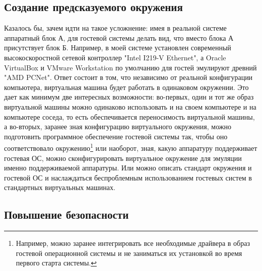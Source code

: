 \documentclass[14pt, a4paper]{article}
\begin{document}
\subsection*{Создание предсказуемого окружения}

Казалось бы, зачем идти на такое усложнение: имея в реальной системе аппаратный
блок А, для гостевой системы делать вид, что вместо блока А присутствует блок Б.
Например, в моей системе установлен современный высокоскоростной сетевой
контроллер "Intel I219-V Ethernet", а Oracle VirtualBox и VMware Workstation по
умолчанию для гостей эмулируют древний "AMD PCNet".
Ответ состоит в том, что независимо от реальной конфигурации компьютера,
виртуальная машина будет работать в одинаковом окружении. Это дает как минимум
две интересных возможности: во-первых, один и тот же образ виртуальной машины
можно одинаково использовать и на своем компьютере и на компьютере соседа, то
есть обеспечивается переносимость виртуальной машины, а во-вторых, заранее зная
конфигурацию виртуального окружения, можно подготовить программное обеспечение
гостевой системы так, чтобы оно соответствовало окружению\footnote{Например, можно заранее интегрировать все необходимые драйвера в образ гостевой
операционной системы и не заниматься их установкой во время первого старта системы.} или наоборот, зная,
какую аппаратуру поддерживает гостевая ОС, можно сконфигурировать виртуальное
окружение для эмуляции именно поддерживаемой аппаратуры.
Или можно описать стандарт окружения и гостевой ОС и наслаждаться
беспроблемным использованием гостевых систем в стандартных виртуальных
машинах.

\subsection*{Повышение безопасности}
\end{document}
